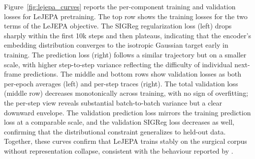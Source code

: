 \documentclass[11pt, a4paper]{article}
\begin{document}
Figure~\ref{fig:lejepa_curves} reports the per-component training and 
validation losses for LeJEPA pretraining. The top row shows the 
training losses for the two terms of the LeJEPA objective. The SIGReg 
regularization loss (left) drops sharply within the first 10k steps 
and then plateaus, indicating that the encoder's embedding 
distribution converges to the isotropic Gaussian target early in 
training. The prediction loss (right) follows a similar trajectory 
but on a smaller scale, with higher step-to-step variance reflecting 
the difficulty of individual next-frame predictions. The middle and 
bottom rows show validation losses as both per-epoch averages (left) 
and per-step traces (right). The total validation loss (middle row) 
decreases monotonically across training, with no sign of overfitting; 
the per-step view reveals substantial batch-to-batch variance but a 
clear downward envelope. The validation prediction loss mirrors the 
training prediction loss at a comparable scale, and the validation 
SIGReg loss decreases as well, confirming that the distributional 
constraint generalizes to held-out data. Together, these curves 
confirm that LeJEPA trains stably on the surgical corpus without 
representation collapse, consistent with the behaviour reported by 
\textcite{balestriero-2025}.
\end{document}

